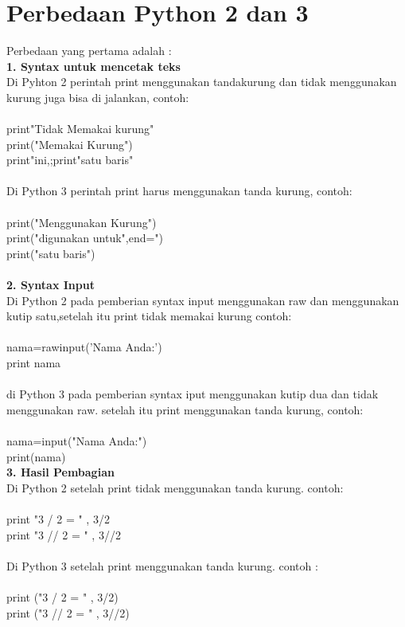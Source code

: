 \documentclass{article}
\begin{document}
\section{Perbedaan Python 2 dan 3}
	Perbedaan yang pertama adalah :\\
	\textbf{1. Syntax untuk mencetak teks}\\
	Di Pyhton 2 perintah print menggunakan tandakurung dan tidak menggunakan  kurung juga bisa di jalankan, contoh:\\
	\\
	print"Tidak Memakai kurung"\\
	print("Memakai Kurung")\\
	print"ini,;print"satu baris"\\
	\\
	Di Python 3 perintah print harus menggunakan tanda kurung, contoh:\\
	\\
	print("Menggunakan Kurung")\\
	print("digunakan untuk",end=")\\
	print("satu baris")\\
	\\
	\textbf{2. Syntax Input}\\
	Di Python 2 pada pemberian syntax input menggunakan raw dan menggunakan kutip satu,setelah itu print tidak memakai kurung contoh:\\
	\\
	 nama=raw\textunderscore input('Nama Anda:')\\
	 print nama\\
	 \\
	 di Python 3 pada pemberian syntax iput menggunakan kutip dua dan tidak menggunakan raw. setelah itu print menggunakan tanda kurung, contoh:\\
	 \\
	 nama=input("Nama Anda:")\\
	 print(nama)\\
	 \textbf{3. Hasil Pembagian}\\
	 Di Python 2 setelah print tidak menggunakan tanda kurung. contoh:\\
	 \\
	 print "3 / 2 = " , 3/2\\
	 print "3 // 2 = " , 3//2\\
	 \\
	 Di Python 3 setelah print menggunakan tanda kurung. contoh :\\
	 \\
	 print ("3 / 2 = " , 3/2)\\
	 print ("3 // 2 = " , 3//2)\\
\end{document}
